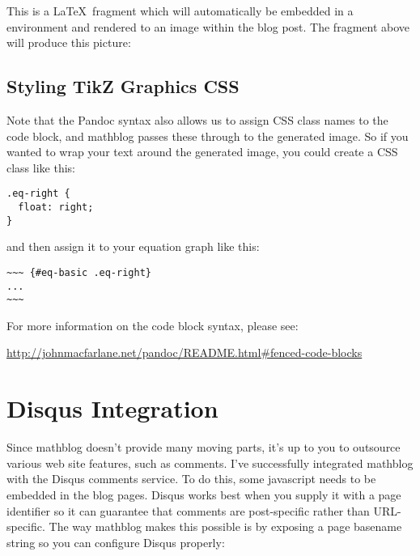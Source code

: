 \documentclass[11pt, letterpaper, oneside, titlepage]{book}
\begin{document}
This is a \LaTeX\ fragment which will automatically be embedded in a
 environment and rendered to an image within the blog
post.  The fragment above will produce this picture:


\subsection{Styling TikZ Graphics CSS}

Note that the Pandoc syntax also allows us to assign CSS class names
to the code block, and mathblog passes these through to the generated
image.  So if you wanted to wrap your text around the generated image,
you could create a CSS class like this:

\begin{verbatim}
.eq-right {
  float: right;
}
\end{verbatim}

and then assign it to your equation graph like this:

\begin{verbatim}
~~~ {#eq-basic .eq-right}
...
~~~
\end{verbatim}

For more information on the code block syntax, please see:

\href{http://johnmacfarlane.net/pandoc/README.html\#fenced-code-blocks}{http://johnmacfarlane.net/pandoc/README.html\#fenced-code-blocks
}

\section{Disqus Integration}
\label{sec:disqus}

Since mathblog doesn't provide many moving parts, it's up to you to
outsource various web site features, such as comments.  I've
successfully integrated mathblog with the Disqus comments service.  To
do this, some javascript needs to be embedded in the blog pages.
Disqus works best when you supply it with a page identifier so it can
guarantee that comments are post-specific rather than URL-specific.
The way mathblog makes this possible is by exposing a page basename
string so you can configure Disqus properly:
\end{document}
